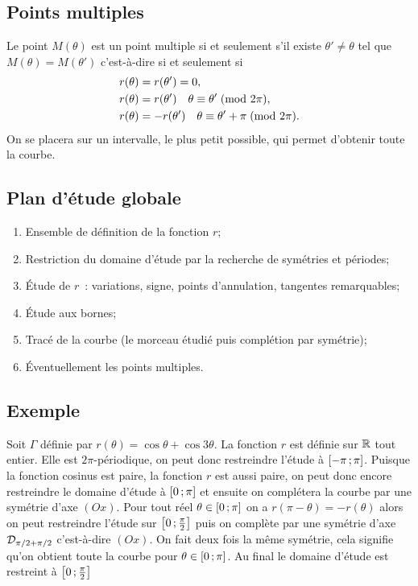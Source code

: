 \subsection{Points multiples}
Le point \(M(\theta)\) est un point multiple si et seulement s'il existe
\(\theta' \neq \theta\) tel que \(M(\theta) = M(\theta')\) c'est-à-dire si et
seulement si
\begin{align}
  r(\theta)&=r(\theta')=0, \\
  r(\theta)&=r(\theta') \quad \theta \equiv \theta'\!\pmod {2\pi},\\
  r(\theta)&=-r(\theta') \quad \theta \equiv \theta'+\pi\!\pmod {2\pi}.
\end{align}
On se placera sur un intervalle, le plus petit possible, qui permet d'obtenir
toute la courbe.

\subsection{Plan d'étude globale}
\begin{enumerate}
  \item Ensemble de définition de la fonction \(r\);
  \item Restriction du domaine d'étude par la recherche de symétries et
    périodes;
  \item Étude de \(r\)~: variations, signe, points d'annulation, tangentes
    remarquables;
  \item Étude aux bornes;
  \item Tracé de la courbe (le morceau étudié puis complétion par symétrie);
  \item Éventuellement les points multiples.
\end{enumerate}

\subsection{Exemple}

Soit \(\Gamma\) définie par \(r(\theta)=\cos \theta + \cos 3\theta\). La
fonction \(r\) est définie sur \(\mathbb{R}\) tout entier. Elle est
\(2\pi\)-périodique, on peut donc restreindre l'étude à
\(\left[ -\pi \, ; {} \pi \right]\). Puisque la fonction cosinus est paire, la
fonction \(r\) est aussi paire, on peut donc encore restreindre le domaine
d'étude à \(\left[ 0 \, ; {} \pi \right]\) et ensuite on complétera la courbe par une
symétrie d'axe \((Ox)\). Pour tout réel \(\theta \in \left[ 0 \, ; {} \pi \right]\)
on a \(r(\pi-\theta)=-r(\theta)\) alors on peut restreindre l'étude sur
\(\left[ 0 \, ; {} \frac{\pi}{2} \right]\) puis on complète par une symétrie d'axe
\(\mathcal{D}_{\pi/2 + \pi/2}\) c'est-à-dire \((Ox)\). On fait deux fois la même
symétrie, cela signifie qu'on obtient toute la courbe pour \(\theta \in
\left[ 0 \, ; {} \pi \right]\). Au final le domaine d'étude est restreint à
\(\left[ 0 \, ; {} \frac{\pi}{2} \right]\)

